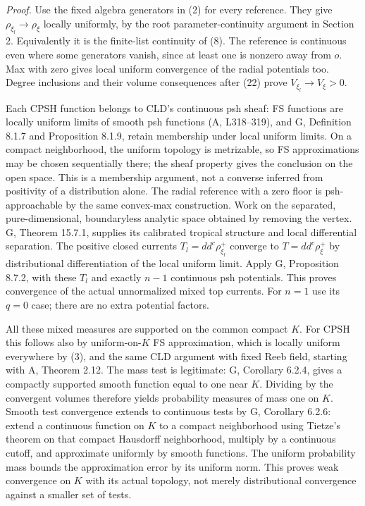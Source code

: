 \documentclass[
  11pt,
]{article}
\begin{document}
\emph{Proof.} Use the fixed algebra generators in (2) for every
reference. They give \(\rho_{\xi_l}\to\rho_\xi\) locally uniformly, by
the root parameter-continuity argument in Section 2. Equivalently it is
the finite-list continuity of (8). The reference is continuous even
where some generators vanish, since at least one is nonzero away from
\(o\). Max with zero gives local uniform convergence of the radial
potentials too. Degree inclusions and their volume consequences after
(22) prove \(V_{\xi_l}\to V_\xi>0\).

Each CPSH function belongs to CLD's continuous psh sheaf: FS functions
are locally uniform limits of smooth psh functions (A, L318--319), and
G, Definition 8.1.7 and Proposition 8.1.9, retain membership under local
uniform limits. On a compact neighborhood, the uniform topology is
metrizable, so FS approximations may be chosen sequentially there; the
sheaf property gives the conclusion on the open space. This is a
membership argument, not a converse inferred from positivity of a
distribution alone. The radial reference with a zero floor is
psh-approachable by the same convex-max construction. Work on the
separated, pure-dimensional, boundaryless analytic space obtained by
removing the vertex. G, Theorem 15.7.1, supplies its calibrated tropical
structure and local differential separation. The positive closed
currents \(T_l=dd^c\rho_{\xi_l}^+\) converge to \(T=dd^c\rho_\xi^+\) by
distributional differentiation of the local uniform limit. Apply G,
Proposition 8.7.2, with these \(T_l\) and exactly \(n-1\) continuous psh
potentials. This proves convergence of the actual unnormalized mixed top
currents. For \(n=1\) use its \(q=0\) case; there are no extra potential
factors.

All these mixed measures are supported on the common compact \(K\). For
CPSH this follows also by uniform-on-\(K\) FS approximation, which is
locally uniform everywhere by (3), and the same CLD argument with fixed
Reeb field, starting with A, Theorem 2.12. The mass test is legitimate:
G, Corollary 6.2.4, gives a compactly supported smooth function equal to
one near \(K\). Dividing by the convergent volumes therefore yields
probability measures of mass one on \(K\). Smooth test convergence
extends to continuous tests by G, Corollary 6.2.6: extend a continuous
function on \(K\) to a compact neighborhood using Tietze's theorem on
that compact Hausdorff neighborhood, multiply by a continuous cutoff,
and approximate uniformly by smooth functions. The uniform probability
mass bounds the approximation error by its uniform norm. This proves
weak convergence on \(K\) with its actual topology, not merely
distributional convergence against a smaller set of tests.
\end{document}
